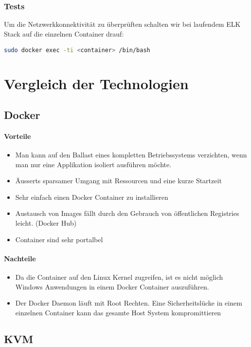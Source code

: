 \subsubsection{Tests}
Um die Netzwerkkonnektivität zu überprüften schalten wir bei laufendem ELK Stack auf die einzelnen Container drauf:
\begin{lstlisting}[language=bash]
sudo docker exec -ti <container> /bin/bash
\end{lstlisting}

\section{Vergleich der Technologien}
\subsection{Docker}
\paragraph{Vorteile}
\begin{itemize}
	\item Man kann auf den Ballast eines kompletten Betriebssystems verzichten, wenn man nur eine Applikation isoliert ausführen möchte.
	\item Äusserts sparsamer Umgang mit Ressourcen und eine kurze Startzeit	
	\item Sehr einfach einen Docker Container zu installieren
	\item Austausch von Images fällt durch den Gebrauch von öffentlichen Registries leicht. (Docker Hub)
	\item Container sind sehr portalbel
\end{itemize}
\paragraph{Nachteile}
\begin{itemize}
	\item Da die Container auf den Linux Kernel zugreifen, ist es nicht möglich Windows Anwendungen in einem Docker Container auszuführen.
	\item Der Docker Daemon läuft mit Root Rechten. Eine Sicherheitslücke in einem einzelnen Container kann das gesamte Host System kompromittieren
\end{itemize}

\subsection{KVM} %
